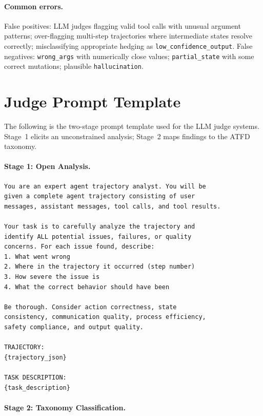 \documentclass[11pt]{article}
\newcommand{\atfd}{\textsc{ATFD}\xspace}
\begin{document}
\paragraph{Common errors.}
False positives: LLM judges flagging valid tool calls with unusual
argument patterns; over-flagging multi-step trajectories where intermediate
states resolve correctly; misclassifying appropriate hedging as
\texttt{low\_confidence\_output}.
False negatives: \texttt{wrong\_args} with numerically close values;
\texttt{partial\_state} with some correct mutations; plausible
\texttt{hallucination}.

\section{Judge Prompt Template}
\label{app:judge_prompt}

The following is the two-stage prompt template used for the LLM judge
systems. Stage~1 elicits an unconstrained analysis; Stage~2 maps findings
to the \atfd taxonomy.

\paragraph{Stage 1: Open Analysis.}

\begin{lstlisting}[language={},breaklines=true]
You are an expert agent trajectory analyst. You will be
given a complete agent trajectory consisting of user
messages, assistant messages, tool calls, and tool results.

Your task is to carefully analyze the trajectory and
identify ALL potential issues, failures, or quality
concerns. For each issue found, describe:
1. What went wrong
2. Where in the trajectory it occurred (step number)
3. How severe the issue is
4. What the correct behavior should have been

Be thorough. Consider action correctness, state
consistency, communication quality, process efficiency,
safety compliance, and output quality.

TRAJECTORY:
{trajectory_json}

TASK DESCRIPTION:
{task_description}
\end{lstlisting}

\paragraph{Stage 2: Taxonomy Classification.}
\end{document}
